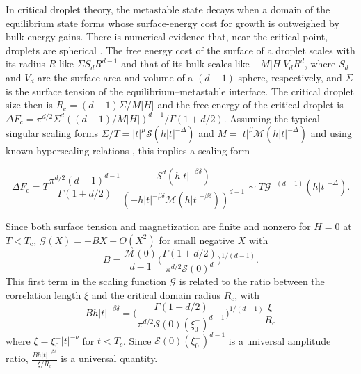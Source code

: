 \documentclass[aps,prl,preprint]{revtex4-1}
\def\[{\begin{equation}}
\def\]{\end{equation}}
\def\O{O}          %
\def\c{\mathrm c}
\def\fM{\mathcal M}  %
\def\fS{\mathcal S}  %
\def\fG{\mathcal G}  %
\def\dim{d}
\newif\ifreprint
\begin{document}
In critical droplet theory, the metastable state decays when a domain of the
equilibrium state forms whose surface-energy cost for growth is outweighed by
bulk-energy gains. There is numerical evidence that, near the critical point, droplets are spherical \cite{gunther.1993.transfer-matrix}. The free energy cost of the surface of a droplet
scales with its radius $R$ like $\Sigma S_\dim R^{\dim-1}$ and that of its
bulk scales like $-M|H|V_\dim R^\dim$, where $S_\dim$ and $V_\dim$ are the surface area and
volume of a $(\dim-1)$-sphere, respectively, and $\Sigma$ is the surface tension of the equilibrium--metastable interface. The critical droplet size then is
$R_\c=(\dim-1)\Sigma/M|H|$ and the free energy of the critical
droplet is $\Delta
F_\c=\pi^{\dim/2}\Sigma^\dim((\dim-1)/M|H|)^{\dim-1}/\Gamma(1+\dim/2)$.  
Assuming the typical singular scaling forms
$\Sigma/T=|t|^\mu\fS(h|t|^{-\Delta})$ and $M=|t|^\beta\mathcal
M(h|t|^{-\Delta})$ and using known hyperscaling relations
\cite{widom.1981.interface}, this implies a scaling form
\def\eqcritformone{
  T\frac{\pi^{\dim/2}(\dim-1)^{\dim-1}}{\Gamma(1+\dim/2)}\frac{\fS^\dim(h|t|^{-\beta\delta})}{(-h|t|^{-\beta\delta}\fM(h|t|^{-\beta\delta}))^{\dim-1}}
}
\def\eqcritformtwo{
  T\fG^{-(\dim-1)}(h|t|^{-\Delta})
}
\ifreprint
\[
  \begin{aligned}
    \Delta F_\c
    &=\eqcritformone\\
    &\sim\eqcritformtwo.
  \end{aligned}
\]
\else
\[
  \Delta F_\c=\eqcritformone\sim\eqcritformtwo.
\]
\fi
Since both surface tension and magnetization are finite and nonzero for $H=0$
at $T<T_\c$, $\fG(X)=-BX+\O(X^2)$ for small negative $X$ with
\[
  B=\frac{\fM(0)}{\dim-1}\bigg(\frac{\Gamma(1+\dim/2)}{\pi^{\dim/2}\fS(0)^\dim}\bigg)^{1/(\dim-1)}.
\]
This first term in the scaling function $\fG$ is related to the ratio between the correlation length $\xi$
and the critical domain radius $R_c$, with
\[
  Bh|t|^{-\beta\delta}=\bigg(\frac{\Gamma(1+\dim/2)}{\pi^{\dim/2}\fS(0)(\xi_0^-)^{\dim-1}}\bigg)^{1/(\dim-1)}\frac\xi{R_\c}
\]
where $\xi=\xi_0^-|t|^{-\nu}$ for $t<T_c$. Since $\fS(0)(\xi_0^-)^{\dim-1}$ is a
universal amplitude ratio, $\frac{Bh|t|^{-\beta\delta}}{\xi/R_c}$ is a
universal quantity.
\end{document}
